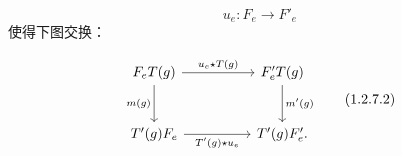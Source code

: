 \begin{equation}
  u_e\colon F_e\longrightarrow F'_e
  \tag{1.2.7.1}
\end{equation}
使得下图交换：

\begin{equation}
\begin{tikzcd}[column sep=huge,row sep=large]
F_eT(g)
  \arrow[r,"u_e\star T(g)"]
  \arrow[d,"m(g)",swap]
&
F_e^{\prime}T(g)
  \arrow[d,"m^{\prime}(g)"]
\\
T^{\prime}(g)F_e
  \arrow[r,"T^{\prime}(g)\star u_e",swap]
&
T^{\prime}(g)F_e^{\prime}\mathpunct{.}
\end{tikzcd}
\tag{1.2.7.2}
\end{equation}
